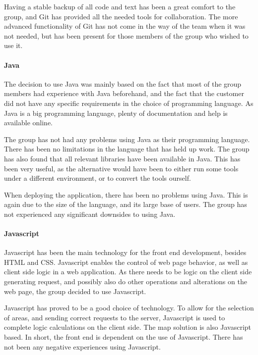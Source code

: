 \documentclass[11pt,a4paper,titlepage,oneside]{report}
\begin{document}
Having a stable backup of all code and text has been a great comfort to the group, and Git has provided all the needed tools for collaboration. The more advanced functionality of Git has not come in the way of the team when it was not needed, but has been present for those members of the group who wished to use it.

\paragraph{Java}
The decision to use Java was mainly based on the fact that most of the group members had experience with Java beforehand, and the fact that the customer did not have any specific requirements in the choice of programming language. As Java is a big programming language, plenty of documentation and help is available online. 

The group has not had any problems using Java as their programming language. There has been no limitations in the language that has held up work. The group has also found that all relevant libraries have been available in Java. This has been very useful, as the alternative would have been to either run some tools under a different environment, or to convert the tools ourself. 

When deploying the application, there has been no problems using Java. This is again due to the size of the language, and its large base of users. The group has not experienced any significant downsides to using Java. 

\paragraph{Javascript}
Javascript has been the main technology for the front end development, besides \gls{HTML} and \gls{CSS}. Javascript enables the control of web page behavior, as well as client side logic in a web application. As there needs to be logic on the client side generating request, and possibly also do other operations and alterations on the web page, the group decided to use Javascript. 

Javascript has proved to be a good choice of technology. To allow for the selection of areas, and sending correct requests to the server, Javascript is used to complete logic calculations on the client side. The map solution is also Javascript based. In short, the front end is dependent on the use of Javascript. There has not been any negative experiences using Javascript. 
\end{document}
